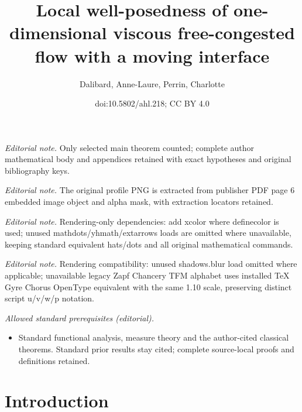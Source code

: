 \documentclass[10pt]{amsart}
\title{Local well-posedness of one-dimensional viscous free-congested flow with a moving interface}
\author{Dalibard, Anne-Laure, Perrin, Charlotte}
\date{doi:10.5802/ahl.218; CC BY 4.0}
\theoremstyle{definition}\newtheorem{defi}[theo]{Definition}\newtheorem{rema}[theo]{Remark}\newtheorem{exam}[theo]{Example}\newtheorem{exem}[theo]{Example}\newtheorem{nota}[theo]{Notation}
\begin{document}
\maketitle
\noindent\textit{Editorial note.} Only selected main theorem counted; complete author mathematical body and appendices retained with exact hypotheses and original bibliography keys.\par\medskip
\noindent\textit{Editorial note.} The original profile PNG is extracted from publisher PDF page 6 embedded image object and alpha mask, with extraction locators retained.\par\medskip
\noindent\textit{Editorial note.} Rendering-only dependencies: add xcolor where definecolor is used; unused mathdots/yhmath/extarrows loads are omitted where unavailable, keeping standard equivalent hats/dots and all original mathematical commands.\par\medskip
\noindent\textit{Editorial note.} Rendering compatibility: unused shadows.blur load omitted where applicable; unavailable legacy Zapf Chancery TFM alphabet uses installed TeX Gyre Chorus OpenType equivalent with the same 1.10 scale, preserving distinct script u/v/w/p notation.\par\medskip
\noindent\textit{Allowed standard prerequisites (editorial).}\begin{itemize}
\item Standard functional analysis, measure theory and the author-cited classical theorems. Standard prior results stay cited; complete source-local proofs and definitions retained.
\end{itemize}\medskip



\section{Introduction}
\end{document}
